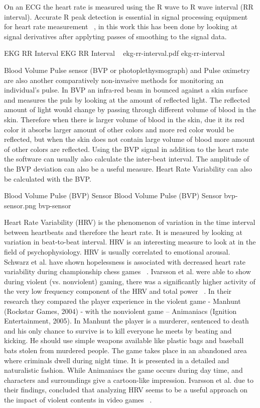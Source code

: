 On an ECG the heart rate is measured using the R wave to R wave interval (RR interval). Accurate R peak detection is essential in signal processing equipment for heart rate measurement ~\cite{pise2011thinkquest}, in this work this has been done by looking at signal derivatives after applyting passes of smoothing to the signal data.

\img
{EKG RR Interval}
{EKG RR Interval ~\cite{wiki2014bvp}}
{ekg-rr-interval.pdf}
{ekg-rr-interval}

Blood Volume Pulse sensor (BVP or photoplethysmograph) and Pulse oximetry are also another comparatively non-invasive methods for monitoring an individual's pulse. In BVP an infra-red beam in bounced against a skin surface and measures the puls by looking at the amount of reflected light. The reflected amount of light would change by passing through different volume of blood in the skin. Therefore when there is larger volume of blood in the skin, due it its red color it absorbs larger amount of other colors and more red color would be reflected, but when the skin does not contain large volume of blood more amount of other colors are reflected. Using the BVP signal in addition to the heart rate the software can usually also calculate the inter-beat interval. The amplitude of the BVP deviation can also be a useful measure. Heart Rate Variability can also be calculated with the BVP.

\img
{Blood Volume Pulse (BVP) Sensor}
{Blood Volume Pulse (BVP) Sensor}
{bvp-sensor.png}
{bvp-sensor}

Heart Rate Variability (HRV) is the phenomenon of variation in the time interval between heartbeats and therefore the heart rate. It is measured by looking at variation in beat-to-beat interval. HRV is an interesting measure to look at in the field of psychophysiology. HRV is usually correlated to emotional arousal. Schwarz et al. have shown hopelessness is associated with decreased heart rate variability during championship chess games ~\cite{schwarz2003hopelessness}. Ivarsson et al. were able to show during violent (vs. nonviolent) gaming, there was a significantly higher activity of the very low frequency component of the HRV and total power ~\cite{ivarsson2009playing}. In their research they compared the player experience in the violent game - Manhunt (Rockstar Games, 2004) - with the nonviolent game – Animaniacs (Ignition Entertainment, 2005). In Manhunt the player is a murderer, sentenced to death and his only chance to survive is to kill everyone he meets by beating and kicking. He should use simple weapons available like plastic bags and baseball bats stolen from murdered people. The game takes place in an abandoned area where criminals dwell during night time. It is presented in a detailed and naturalistic fashion. While Animaniacs the game occurs during day time, and characters and surroundings give a cartoon-like impression. Ivarsson et al. due to their findings, concluded that analyzing HRV seems to be a useful approach on the impact of violent contents in video games ~\cite{ivarsson2009playing}.

